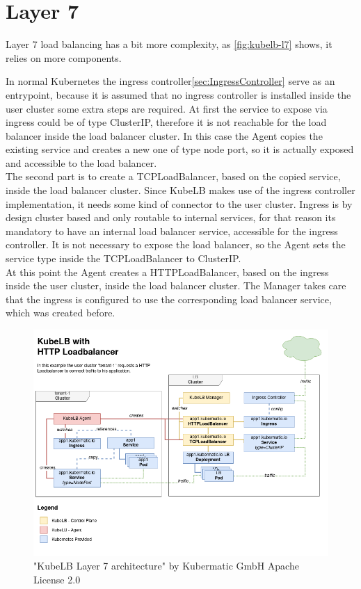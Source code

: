 \section{Layer 7}

Layer 7 load balancing has a bit more complexity, as \autoref{fig:kubelb-l7} shows, it relies on more components.

In normal Kubernetes the ingress controller\autoref{sec:IngressController} serve as an entrypoint, because it is assumed that no ingress controller is installed inside the user cluster some extra steps are required.
At first the service to expose via ingress could be of type ClusterIP, therefore it is not reachable for the load balancer inside the load balancer cluster.
In this case the Agent copies the existing service and creates a new one of type node port, so it is actually exposed and accessible to the load balancer.
\\
The second part is to create a TCPLoadBalancer, based on the copied service, inside the load balancer cluster.
Since KubeLB makes use of the ingress controller implementation, it needs some kind of connector to the user cluster.
Ingress is by design cluster based and only routable to internal services, for that reason its mandatory to have an internal load balancer service, accessible for the ingress controller.
It is not necessary to expose the load balancer, so the Agent sets the service type inside the TCPLoadBalancer to ClusterIP.
\\
At this point the Agent creates a HTTPLoadBalancer, based on the ingress inside the user cluster, inside the load balancer cluster.
The Manager takes care that the ingress is configured to use the corresponding load balancer service, which was created before.

\begin{figure}[H]
    \centering
    \includegraphics[width=1\linewidth]{media/06/kubelb-l7}
    \caption{"KubeLB Layer 7 architecture" by Kubermatic GmbH Apache License 2.0}
    \label{fig:kubelb-l7}
\end{figure}

